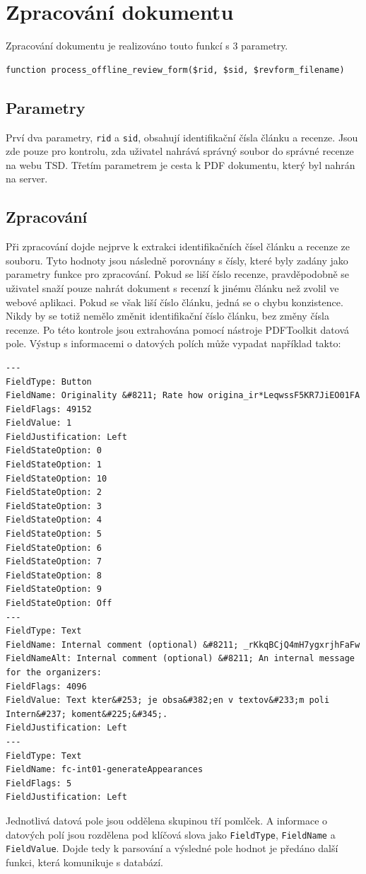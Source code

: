 \documentclass[czech,BP]{thesiskiv}
\begin{document}
\section{Zpracování dokumentu}
Zpracování dokumentu je realizováno touto funkcí s 3 parametry.
\begin{lstlisting}
function process_offline_review_form($rid, $sid, $revform_filename) 
\end{lstlisting}
\subsection{Parametry}
Prví dva parametry, \texttt{rid} a \texttt{sid}, obsahují identifikační čísla článku a recenze. Jsou zde pouze pro kontrolu, zda uživatel nahrává správný soubor do správné recenze na webu TSD. Třetím parametrem je cesta k PDF dokumentu, který byl nahrán na server.
\subsection{Zpracování}
Při zpracování dojde nejprve k extrakci identifikačních čísel článku a recenze ze souboru. Tyto hodnoty jsou následně porovnány s čísly, které byly zadány jako parametry funkce pro zpracování. Pokud se liší číslo recenze, pravděpodobně se uživatel snaží pouze nahrát dokument s recenzí k jinému článku než zvolil ve webové aplikaci. Pokud se však liší číslo článku, jedná se o chybu konzistence. Nikdy by se totiž nemělo změnit identifikační číslo článku, bez změny čísla recenze. Po této kontrole jsou extrahována pomocí nástroje PDFToolkit datová pole. Výstup s informacemi o datových polích může vypadat například takto:
\label{vystup}
\begin{lstlisting}[basicstyle=\tiny]
---
FieldType: Button
FieldName: Originality &#8211; Rate how origina_ir*LeqwssF5KR7JiEO01FA
FieldFlags: 49152
FieldValue: 1
FieldJustification: Left
FieldStateOption: 0
FieldStateOption: 1
FieldStateOption: 10
FieldStateOption: 2
FieldStateOption: 3
FieldStateOption: 4
FieldStateOption: 5
FieldStateOption: 6
FieldStateOption: 7
FieldStateOption: 8
FieldStateOption: 9
FieldStateOption: Off
---
FieldType: Text
FieldName: Internal comment (optional) &#8211; _rKkqBCjQ4mH7ygxrjhFaFw
FieldNameAlt: Internal comment (optional) &#8211; An internal message for the organizers:
FieldFlags: 4096
FieldValue: Text kter&#253; je obsa&#382;en v textov&#233;m poli Intern&#237; koment&#225;&#345;.
FieldJustification: Left
---
FieldType: Text
FieldName: fc-int01-generateAppearances
FieldFlags: 5
FieldJustification: Left
\end{lstlisting}
Jednotlivá datová pole jsou oddělena skupinou tří pomlček. A informace o datových polí jsou rozdělena pod klíčová slova jako \texttt{FieldType}, \texttt{FieldName} a \texttt{FieldValue}. Dojde tedy k parsování a výsledné pole hodnot je předáno další funkci, která komunikuje s databází. 
\end{document}
